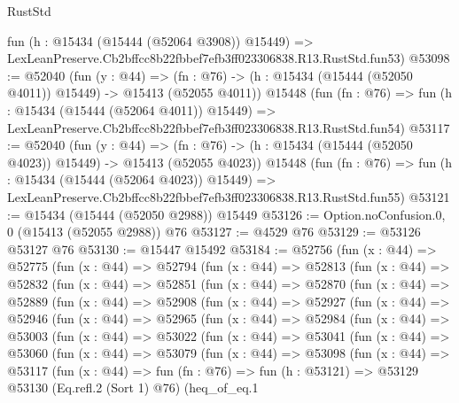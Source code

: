 \begin{lexlean}{RustStd}
\begin{coremodule}
    fun (h : @15434 (@15444 (@52064 @3908)) @15449) =>
    LexLeanPreserve.Cb2bffcc8b22fbbef7efb3ff023306838.R13.RustStd.fun53)
@53098 := @52040
    (fun (y : @44) =>
    (fn : @76) -> (h : @15434 (@15444 (@52050 @4011)) @15449) -> @15413 (@52055 @4011))
    @15448
    (fun (fn : @76) =>
    fun (h : @15434 (@15444 (@52064 @4011)) @15449) =>
    LexLeanPreserve.Cb2bffcc8b22fbbef7efb3ff023306838.R13.RustStd.fun54)
@53117 := @52040
    (fun (y : @44) =>
    (fn : @76) -> (h : @15434 (@15444 (@52050 @4023)) @15449) -> @15413 (@52055 @4023))
    @15448
    (fun (fn : @76) =>
    fun (h : @15434 (@15444 (@52064 @4023)) @15449) =>
    LexLeanPreserve.Cb2bffcc8b22fbbef7efb3ff023306838.R13.RustStd.fun55)
@53121 := @15434 (@15444 (@52050 @2988)) @15449
@53126 := Option.noConfusion.{0, 0} (@15413 (@52055 @2988)) @76
@53127 := @4529 @76
@53129 := @53126 @53127 @76
@53130 := @15447 @15492
@53184 := @52756
    (fun (x : @44) =>
    @52775
      (fun (x : @44) =>
      @52794
        (fun (x : @44) =>
        @52813
          (fun (x : @44) =>
          @52832
            (fun (x : @44) =>
            @52851
              (fun (x : @44) =>
              @52870
                (fun (x : @44) =>
                @52889
                  (fun (x : @44) =>
                  @52908
                    (fun (x : @44) =>
                    @52927
                      (fun (x : @44) =>
                      @52946
                        (fun (x : @44) =>
                        @52965
                          (fun (x : @44) =>
                          @52984
                            (fun (x : @44) =>
                            @53003
                              (fun (x : @44) =>
                              @53022
                                (fun (x : @44) =>
                                @53041
                                  (fun (x : @44) =>
                                  @53060
                                    (fun (x : @44) =>
                                    @53079
                                      (fun (x : @44) =>
                                      @53098
                                        (fun (x : @44) =>
                                        @53117
                                          (fun (x : @44) =>
                                          fun (fn : @76) =>
                                          fun (h : @53121) =>
                                          @53129
                                            @53130
                                            (Eq.refl.{2} (Sort 1) @76)
                                            (heq_of_eq.{1}

\end{coremodule}
\end{lexlean}
